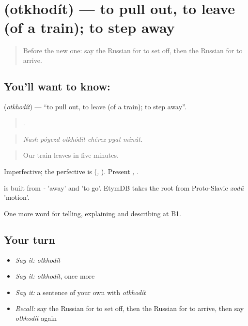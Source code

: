 \section[\texorpdfstring{\ru{отходить} (otkhodít)}{отходить (otkhodít)}]{ (otkhodít) — to pull out, to leave (of a train); to step away}

\label{lesson:RU-C415-otkhodit}



\begin{quote}
Before the new one: say the Russian for to set off, then the Russian for to arrive.
\end{quote}

\subsection*{You'll want to know: }
\textbf{} (\emph{otkhodít}) — \textquotedblleft{}to pull out, to leave (of a train); to step away\textquotedblright{}.

\begin{quote}
     .
\end{quote}

\begin{quote}
\emph{Nash póyezd otkhódit chérez pyat minút.}
\end{quote}

\begin{quote}
Our train leaves in five minutes.
\end{quote}

Imperfective; the perfective is \emph{} (\emph{, }). Present \emph{, }.

\begin{cousinweb}
\emph{} is built from \emph{-} 'away' and \emph{} 'to go'. EtymDB takes the root from Proto-Slavic \emph{xodŭ} 'motion'.
\end{cousinweb}

\begin{grammarlens}[title={What you've built}]
One more word for telling, explaining and describing at B1.
\end{grammarlens}

\subsection*{Your turn}
\begin{itemize}
\raggedright
  \item \emph{Say it:} \emph{otkhodít}
  \item \emph{Say it:} \emph{otkhodít}, once more
  \item \emph{Say it:} a sentence of your own with \emph{otkhodít}
  \item \emph{Recall:} say the Russian for to set off, then the Russian for to arrive, then say \emph{otkhodít} again
\end{itemize}

